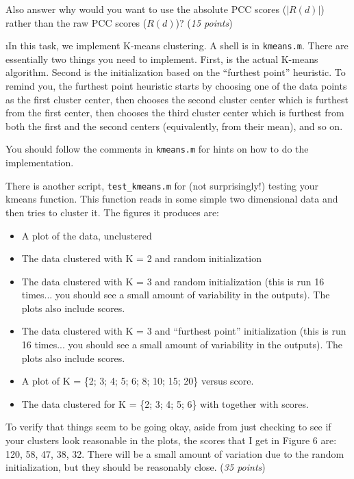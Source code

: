 \documentclass[fleqn]{article}
\begin{document}
Also answer why would you want to use the absolute PCC scores ($|R(d)|$) rather than the 
raw PCC scores ($R(d)$)? (\textit{15 points}) 

\i In this task, we implement K-means clustering. A shell is in \texttt{kmeans.m}. 
There are essentially two things you need to implement. First, is the actual 
K-means algorithm. Second is the initialization based on the ``furthest point'' 
heuristic. To remind you, the furthest point heuristic starts by
choosing one of the data points as the first cluster center, then chooses the
second cluster center which is furthest from the first center, then chooses 
the third cluster center which is furthest from both the first and the second 
centers (equivalently, from their mean), and so on.

You should follow the comments in \texttt{kmeans.m} for hints on how to do the 
implementation. 

There is another script, \texttt{test\_kmeans.m} for (not surprisingly!) testing 
your kmeans function. This function reads in some simple two dimensional data and 
then tries to cluster it. The figures it produces are:

\begin{itemize}
  \item A plot of the data, unclustered
  \item The data clustered with K = 2 and random initialization
  \item The data clustered with K = 3 and random initialization (this is run 
  16 times... you should see a small
  amount of variability in the outputs). The plots also include scores.
  \item The data clustered with K = 3 and ``furthest point'' initialization 
  (this is run 16 times... you should see a small amount of variability in the 
  outputs). The plots also include scores.
  \item A plot of K = \{2; 3; 4; 5; 6; 8; 10; 15; 20\} versus score.
  \item The data clustered for K = \{2; 3; 4; 5; 6\} with together with scores.
\end{itemize}

To verify that things seem to be going okay, aside from just checking to see if 
your clusters look reasonable in the plots, the scores that I get in Figure 6 are: 
120, 58, 47, 38, 32. There will be a small amount of variation due to the random 
initialization, but they should be reasonably close. (\textit{35 points})

\ene
\end{document}

